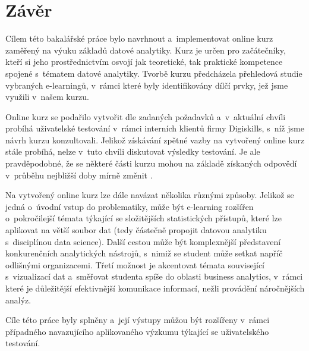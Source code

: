 \hypertarget{zuxe1vux11br}{%
\chapter*{Závěr}\label{zaver}}

Cílem této bakalářské práce bylo navrhnout a~implementovat online kurz zaměřený na výuku základů datové analytiky. Kurz je určen pro začátečníky, kteří si jeho prostřednictvím osvojí jak teoretické, tak praktické kompetence spojené s~tématem datové analytiky. Tvorbě kurzu předcházela přehledová studie vybraných e-learningů, v~rámci které byly identifikovány dílčí prvky, jež jsme využili v~našem kurzu.

Online kurz se podařilo vytvořit dle zadaných požadavků a~v~aktuální chvíli probíhá uživatelské testování v~rámci interních klientů firmy Digiskills, s~níž jsme návrh kurzu konzultovali. Jelikož získávání zpětné vazby na vytvořený online kurz stále probíhá, nelze v~tuto chvíli diskutovat výsledky testování. Je ale pravděpodobné, že se některé části kurzu mohou na základě získaných odpovědí v~průběhu nejbližší doby mírně změnit .

Na vytvořený online kurz lze dále navázat několika různými způsoby. Jelikož se jedná o~úvodní vstup do problematiky, může být e-learning rozšířen o~pokročilejší témata týkající se složitějších statistických přístupů, které lze aplikovat na větší soubor dat (tedy částečně propojit datovou analytiku s~disciplínou data science). Další cestou může být komplexnější představení konkurenčních analytických nástrojů, s~nimiž se student může setkat napříč odlišnými organizacemi. Třetí možnost je akcentovat témata související s~vizualizací dat a~směřovat studenta spíše do oblasti business analytics, v~rámci které je důležitější efektivnější komunikace informací, nežli provádění náročnějších analýz.

Cíle této práce byly splněny a~její výstupy můžou být rozšířeny v~rámci případného navazujícího aplikovaného výzkumu týkající se uživatelského testování.
